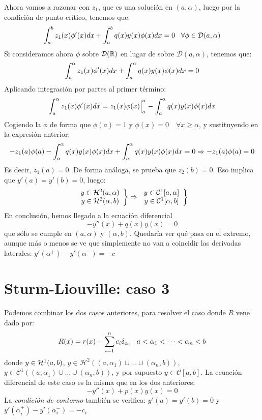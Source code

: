 Ahora vamos a razonar con $z_1$, que es una solución en $(a,\alpha)$, luego por la condición de punto crítico, tenemos que:
\[
\integral{a}{b}{z_1(x)\phi'(x)dx}+\integral{a}{b}{q(x)y(x)\phi(x)dx}=0 \espacio \forall\phi\in\mathcal{D}(a,\alpha)
\]
Si consideramos ahora $\phi$ sobre $\mathcal{D}(\R)$ en lugar de sobre $\mathcal{D}(a,\alpha)$, tenemos que:
\[
\integral{a}{\alpha}{z_1(x)\phi'(x)dx}+\integral{a}{\alpha}{q(x)y(x)\phi(x)dx}=0
\] 
Aplicando integración por partes al primer término:
\[
\integral{a}{\alpha}{z_1(x)\phi'(x)dx}=z_1(x)\phi(x)\Big|_a^\alpha-\integral{a}{\alpha}{q(x)y(x)\phi(x)dx}
\]
Cogiendo la $\phi$ de forma que $\phi(a)=1$ y $\phi(x)=0\quad\forall x\geq\alpha$, y sustituyendo en la expresión anterior:
\[
-z_1(a)\phi(a)-\integral{a}{\alpha}{q(x)y(x)\phi(x)dx}+\integral{a}{\alpha}{q(x)y(x)\phi(x)dx}=0 \Rightarrow -z_1(a)\phi(a)=0
\]
Es decir, $z_1(a)=0$. De forma análoga, se prueba que $z_2(b)=0$. Eso implica que $y'(a)=y'(b)=0$, luego: 
\[
\left.
\begin{array}{cc}
y\in\sobolev[a,\alpha]{2}\\
y\in\sobolev[\alpha,b]{2}
\end{array}
\right\} \Rightarrow
\left.
\begin{array}{cc}
y\in\mathcal{C}^1[a,\alpha]\\
y\in\mathcal{C}^1[\alpha,b]
\end{array}
\right\}
\]
En conclusión, hemos llegado a la ecuación diferencial
\[
-y''(x)+q(x)y(x)=0
\]
que sólo se cumple en $(a,\alpha)$ y $(\alpha,b)$. Quedaría ver qué pasa en el extremo, aunque más o menos se ve que simplemente no van a coincidir las derivadas laterales: $y'(\alpha^+)-y'(\alpha^-)=-c$

\section{Sturm-Liouville: caso 3}

Podemos combinar los dos casos anteriores, para resolver el caso donde $R$ vene dado por:
\[
R(x)=r(x)+\sum_{i=1}^nc_i\delta_{\alpha_i} \espacio a<\alpha_1<\cdots<\alpha_n<b
\]
donde $y\in\sobolev{1}$, $y\in\mathcal{H}^2\left((a,\alpha_1)\cup\dots\cup(\alpha_n,b)\right)$, $y\in\mathcal{C}^1\left((a,\alpha_1)\cup\dots\cup(\alpha_n,b)\right)$, y por supuesto $y\in\mathcal{C}[a,b]$. La ecuación diferencial de este caso es la misma que en los dos anteriores:
\[
-y''(x)+p(x)y(x)=0
\]
La \textit{condición de contorno} también se verifica: $y'(a)=y'(b)=0$ y$y'(\alpha^+_i)-y'(\alpha^-_i)=-c_i$

